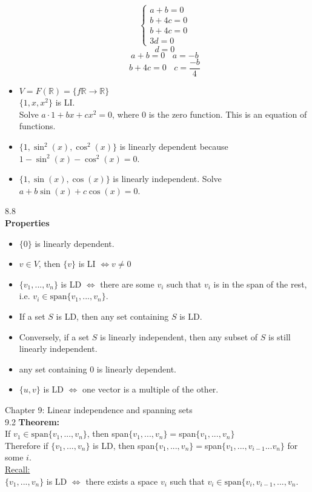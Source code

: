 \documentclass[]{article}
\begin{document}
\begin{itemize}
$$			$$
			$$
				\begin{cases}
					a+b=0\\
					b+4c=0\\
					b+4c=0\\
					3d=0
				\end{cases}
			$$
			$$
			d=0
			$$
			$$
				a+b=0~~~~a=-b
			$$
			$$
				b+4c=0~~~~c=\frac{-b}{4}
			$$
			\item $V=F(\mathbb{R})=\{f\mathbb{R}\rightarrow\mathbb{R}\}$\\
			$\{1,x,x^2\}$ is LI.\\
			Solve $a\cdot 1+bx+cx^2=0$, where 0 is the zero function. This is an equation of functions.
			\item $\{1,\sin^2(x),\cos^2(x)\}$ is linearly dependent because $1-\sin^2(x)-\cos^2(x)=0$.
			\item $\{1,\sin(x),\cos(x)\}$ is linearly independent. Solve $a+b\sin(x)+c\cos(x)=0$.
		\end{itemize}
		\large{8.8}\\
		\normalsize
		{\bf Properties}
		\begin{itemize}
			\item $\{0\}$ is linearly dependent.
			\item $v\in V$, then $\{v\}$ is LI $\iff v\ne 0$
			\item $\{v_1,...,v_n\}$ is LD $\iff$ there are some $v_i$ such that $v_i$ is in the span of the rest, i.e. $v_i\in\text{span}\{v_1,...,v_n\}$.
			\item If a set $S$ is LD, then any set containing $S$ is LD.
			\item Conversely, if a set $S$ is linearly independent, then any subset of $S$ is still linearly independent.
			\item any set containing 0 is linearly dependent.
			\item $\{u,v\}$ is LD $\iff$ one vector is a multiple of the other.
		\end{itemize}
		\pagebreak
		\Large{Chapter 9: Linear independence and spanning sets}\\
		\large{9.2}
		\normalsize
		{\bf Theorem:}\\
		If $v_1\in\text{span}\{v_1,...,v_n\}$, then span$\{v_1,...,v_n\}=$span$\{v_1,...,v_n\}$\\
		Therefore if $\{v_1,...,v_n\}$ is LD, then span$\{v_1,...,v_n\}=$span$\{v_1,...,v_{i-1}...v_n\}$ for some $i$.\\
		\underline{Recall:}\\
		$\{v_1,...,v_n\}$ is LD $\iff$ there exists a space $v_i$ such that $v_i\in\text{span}\{v_i,v_{i-1},...,v_n$.\\
\end{document}
